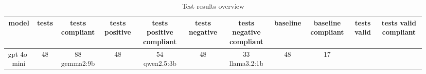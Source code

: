 
  \begin{table}[h!]
  \centering
  \begin{tabular}{|c|c|c|c|c|c|c|c|c|c|c|}
  \hline
  model & tests & tests compliant & tests positive & tests positive compliant & tests negative & tests negative compliant & baseline & baseline compliant & tests valid & tests valid compliant \\
  \hline
  gpt-4o-mini & 48 & 88%
\hline
gemma2:9b & 48 & 54%
\hline
qwen2.5:3b & 48 & 33%
\hline
llama3.2:1b & 48 & 17%
  \end{tabular}
  \caption{Test results overview}
  
  \end{table}
  